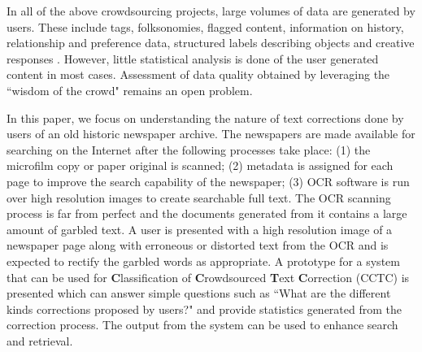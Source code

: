 \documentclass{sig-alternate}
\begin{document}
In all of the above crowdsourcing projects, large volumes of data are generated by users. These include tags, folksonomies, flagged content, information on history, relationship and preference data, structured labels describing objects and creative responses \cite{Ridge_11}. However, little statistical analysis is done of the user generated content in most cases. Assessment of data quality obtained by leveraging the ``wisdom of the crowd" remains an open problem. 


In this paper, we focus on understanding the nature of text corrections done by users of an old historic newspaper archive. The newspapers are made available for searching on the Internet after the following processes take place: (1) the microfilm copy or paper original is scanned; %
(2) metadata is assigned for each page to improve the search capability of the newspaper; (3) OCR software is run over high resolution images to create searchable full text.
The OCR scanning process is far from perfect and the documents generated from it contains a large amount of garbled text. A user is presented with a high resolution image of a newspaper page along with erroneous or distorted text from the OCR and is expected to rectify the garbled words as appropriate. A prototype for a system that can be used for \textbf{C}lassification of \textbf{C}rowdsourced \textbf{T}ext \textbf{C}orrection (CCTC) is presented which can answer simple questions such as ``What are the different kinds corrections proposed by users?" and provide statistics generated from the correction process. The output from the system can be used to enhance search and retrieval.
\end{document}
